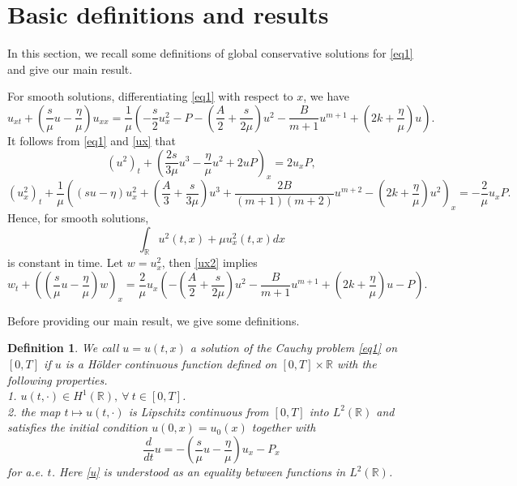 \documentclass[10pt]{article}
\newtheorem{defi}[theo]{Definition}
\numberwithin{equation}{section}
\begin{document}
	\section{\textbf{Basic definitions and results}}\label{Basic definitions}
	In this section, we recall some definitions of global conservative solutions for \eqref{eq1} and give our main result.
	
	For smooth solutions, differentiating \eqref{eq1} with respect to $x$, we have
	\begin{equation}\label{ux}
		u_{xt}+\left(\frac{s}{\mu}u-\frac{\eta}{\mu}\right)u_{xx}
		=\frac{1}{\mu}\left(-\frac{s}{2}u_x^2-P-\left(\frac{A}{2}+\frac{s}{2\mu}\right)u^2-\frac{B}{m+1}u^{m+1}+\left(2k+\frac{\eta}{\mu}\right)u\right).
	\end{equation}
	It follows from \eqref{eq1} and \eqref{ux} that
	\begin{equation*}
		\left(u^2\right)_t+\left(\frac{2s}{3\mu}u^3-\frac{\eta}{\mu}u^2+2uP\right)_x=2u_xP,
	\end{equation*}
	\begin{equation}\label{ux2}
		\left(u_x^2\right)_t+\frac{1}{\mu}\left(\left(su-\eta\right)u_x^2+\left(\frac A3+\frac{s}{3\mu}\right)u^3+\frac{2B}{(m+1)(m+2)}u^{m+2}-\left(2k+\frac{\eta}{\mu}\right)u^2\right)_x=-\frac{2}{\mu}u_xP.
	\end{equation}
	Hence, for smooth solutions,
	\begin{equation}\label{conservative_E(t)}
		\int_{\mathbb{R}}u^2(t,x)+\mu u_x^2(t,x)dx
	\end{equation}
	is constant in time. Let $w=u_x^2$, then \eqref{ux2} implies
	\begin{equation}\label{eqw}
		w_t+\left(\left(\frac{s}{\mu}u-\frac{\eta}{\mu}\right)w\right)_x=\frac{2}{\mu}u_x\left(-\left(\frac A2+\frac{s}{2\mu}\right)u^2-\frac{B}{m+1}u^{m+1}+\left(2k+\frac{\eta}{\mu}\right)u-P\right).
	\end{equation}
	
	Before providing our main result, we give some definitions.
	\begin{defi}\label{solution}
		We call $u=u(t,x)$ a solution of the Cauchy problem \eqref{eq1} on $[0,T]$ if $u$ is a H\"{o}lder continuous function defined on $[0,T]\times\mathbb{R}$ with the following properties. \\
		1. $u(t,\cdot)\in H^1(\mathbb{R}),\ \forall\ t\in[0,T]$.\\
		2. the map $t\mapsto u(t,\cdot)$ is Lipschitz continuous from $[0,T]$ into $L^2(\mathbb{R})$ and satisfies the initial condition $u(0,x)=u_0(x)$ together with
		\begin{equation}\label{u}
			\frac{d}{dt}u=-\left(\frac{s}{\mu}u-\frac{\eta}{\mu}\right)u_x-P_x
		\end{equation}
		for a.e. $t$. Here \eqref{u} is understood as an equality between functions in $L^2(\mathbb{R})$.
	\end{defi}
	
\end{document}
